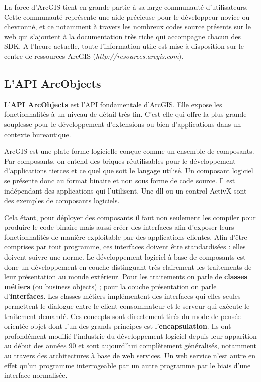 \documentclass[11pt]{article}
\begin{document}
La force d’ArcGIS tient en grande partie à sa large communauté d’utilisateurs. Cette communauté représente une aide précieuse pour le développeur novice ou chevronné, et ce notamment à travers les nombreux codes source présents sur le web qui s’ajoutent à la documentation très riche qui accompagne chacun des SDK. A l’heure actuelle, toute l’information utile est mise à disposition sur le centre de ressources ArcGIS (\textit{http://resources.arcgis.com}).


\subsection{L'API ArcObjects}
L'\textbf{API ArcObjects} est l'API fondamentale d'ArcGIS. Elle expose les fonctionnalités à un niveau de détail très fin. C'est elle qui offre la plus grande souplesse pour le développement d'extensions ou bien d'applications dans un contexte bureautique.

ArcGIS est une plate-forme logicielle conçue comme un ensemble de composants. Par composants, on entend des briques réutilisables pour le développement d'applications tierces et ce quel que soit le langage utilisé. Un composant logiciel se présente donc au format binaire et non sous forme de code source. Il est indépendant des applications qui l'utilisent. Une dll ou un control ActivX sont des exemples de composants logiciels.

Cela  étant, pour déployer des composants il faut non seulement les compiler pour produire le code binaire mais aussi créer des interfaces afin d'exposer leurs fonctionnalités de manière exploitable par des applications clientes. Afin d'être comprises par tout programme, ces interfaces doivent être standardisées : elles doivent suivre une norme. Le développement logiciel à base de composants est donc un développement en couche distinguant très clairement les traitements de leur présentation au monde extérieur. Pour les traitements on parle de \textbf{classes métiers} (ou business objects) ; pour la couche présentation on parle d'\textbf{interfaces}. Les classes métiers implémentent des interfaces qui elles seules permettent le dialogue entre le client consommateur et le serveur qui exécute le traitement demandé. Ces concepts sont directement tirés du mode de pensée orientée-objet dont l'un des grands principes est l'\textbf{encapsulation}. Ils ont profondément modifié l'industrie du développement logiciel depuis leur apparition au début des années 90 et sont aujourd'hui complètement généralisés, notamment au travers des architectures à base de web services. Un web service n'est autre en effet qu'un programme interrogeable par un autre programme par le biais d'une interface normalisée.
\end{document}
